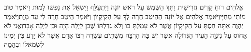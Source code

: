 \documentclass[../main/main.tex]{subfiles}
\begin{document}
\begin{multicols*}{\ncols}
אֱלֹהִים רוּחַ קָדִים חֲרִישִׁית וַתַּךְ הַשֶּׁמֶשׁ עַל רֹאשׁ יוֹנָה וַיִּתְעַלָּף וַיִּשְׁאַל אֶת נַפְשׁוֹ לָמוּת וַיֹּאמֶר טוֹב מוֹתִי מֵחַיָּי\PreVerseSpace{}וַיֹּאמֶר אֱלֹהִים אֶל יוֹנָה הַהֵיטֵב חָרָה לְךָ עַל הַקִּיקָיוֹן וַיֹּאמֶר הֵיטֵב חָרָה לִי עַד מָוֶת\PreVerseSpace{}וַיֹּאמֶר יַהְוֶה אַתָּה חַסְתָּ עַל הַקִּיקָיוֹן אֲשֶׁר לֹא עָמַלְתָּ בּוֹ וְלֹא גִדַּלְתּוֹ שֶׁבִּן לַיְלָה הָיָה וּבִן לַיְלָה אָבָד\PreVerseSpace{}וַאֲנִי לֹא אָחוּס עַל נִינְוֵה הָעִיר הַגְּדוֹלָה אֲשֶׁר יֶשׁ בָּהּ הַרְבֵּה מִשְׁתֵּים עֶשְׂרֵה רִבּוֹ אָדָם אֲשֶׁר לֹא יָדַע בֵּין יְמִינוֹ לִשְׂמֹאלוֹ וּבְהֵמָה\par
\end{multicols*}
\end{document}
